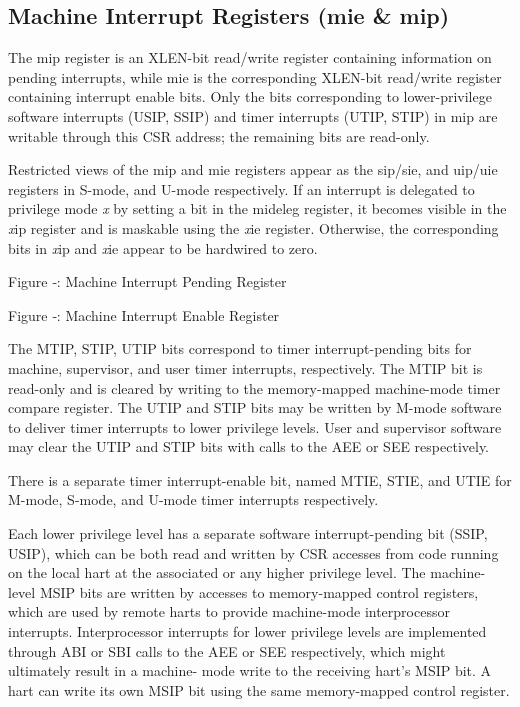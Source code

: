 \subsection{Machine Interrupt Registers (mie \&
mip)}\label{machine-interrupt-registers-mie-mip}

The mip register is an XLEN-bit read/write register containing
information on pending interrupts, while mie is the corresponding
XLEN-bit read/write register containing interrupt enable bits. Only the
bits corresponding to lower-privilege software interrupts (USIP, SSIP)
and timer interrupts (UTIP, STIP) in mip are writable through this CSR
address; the remaining bits are read-only.

Restricted views of the mip and mie registers appear as the sip/sie, and
uip/uie registers in S-mode, and U-mode respectively. If an interrupt is
delegated to privilege mode \emph{x} by setting a bit in the mideleg
register, it becomes visible in the \emph{x}ip register and is maskable
using the \emph{x}ie register. Otherwise, the corresponding bits in
\emph{x}ip and \emph{x}ie appear to be hardwired to zero.

\missingfigure{}

Figure ‑: Machine Interrupt Pending Register

\missingfigure{}
Figure ‑: Machine Interrupt Enable Register

The MTIP, STIP, UTIP bits correspond to timer interrupt-pending bits for
machine, supervisor, and user timer interrupts, respectively. The MTIP
bit is read-only and is cleared by writing to the memory-mapped
machine-mode timer compare register. The UTIP and STIP bits may be
written by M-mode software to deliver timer interrupts to lower
privilege levels. User and supervisor software may clear the UTIP and
STIP bits with calls to the AEE or SEE respectively.

There is a separate timer interrupt-enable bit, named MTIE, STIE, and
UTIE for M-mode, S-mode, and U-mode timer interrupts respectively.

Each lower privilege level has a separate software interrupt-pending bit
(SSIP, USIP), which can be both read and written by CSR accesses from
code running on the local hart at the associated or any higher privilege
level. The machine-level MSIP bits are written by accesses to
memory-mapped control registers, which are used by remote harts to
provide machine-mode interprocessor interrupts. Interprocessor
interrupts for lower privilege levels are implemented through ABI or SBI
calls to the AEE or SEE respectively, which might ultimately result in a
machine- mode write to the receiving hart's MSIP bit. A hart can write
its own MSIP bit using the same memory-mapped control register.

